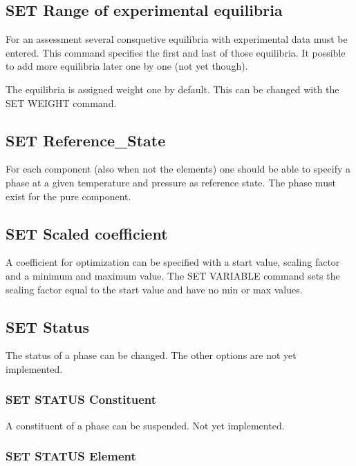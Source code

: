 \documentclass[12pt]{article}
\begin{document}
\subsection{SET Range of experimental equilibria}\label{sc:enterrange}

For an assessment several consquetive equilibria with experimental
data must be entered.  This command specifies the first and last of
those equilibria.  It possible to add more equilibria later one by
one (not yet though).  

The equilibria is assigned weight one by default.  This can be changed
with the SET WEIGHT command.

\subsection{SET Reference\_State}

For each component (also when not the elements) one should be able to
specify a phase at a given temperature and pressure as reference
state.  The phase must exist for the pure component.

\subsection{SET Scaled coefficient}

A coefficient for optimization can be specified with a start value,
scaling factor and a minimum and maximum value.  The SET VARIABLE
command sets the scaling factor equal to the start value and have no
min or max values.

\subsection{SET Status}

The status of a phase can be changed.  The other options are
not yet implemented.

\subsubsection{SET STATUS Constituent}

A constituent of a phase can be suspended.  Not yet implemented.

\subsubsection{SET STATUS Element}
\end{document}
